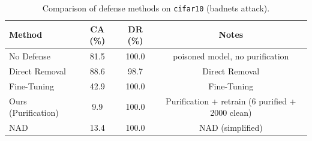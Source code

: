 \begin{table}[htbp]
\centering
\caption{Comparison of defense methods on \texttt{cifar10} (badnets attack).}
\label{tab:results}
\begin{tabular}{lccc}
\toprule
Method & CA (\%) & DR (\%) & Notes \\
\midrule
  No Defense & 81.5 & 100.0 & poisoned model, no purification \\
  Direct Removal & 88.6 & 98.7 & Direct Removal \\
  Fine-Tuning & 42.9 & 100.0 & Fine-Tuning \\
  Ours (Purification) & 9.9 & 100.0 & Purification + retrain (6 purified + 2000 clean) \\
  NAD & 13.4 & 100.0 & NAD (simplified) \\
\bottomrule
\end{tabular}
\end{table}